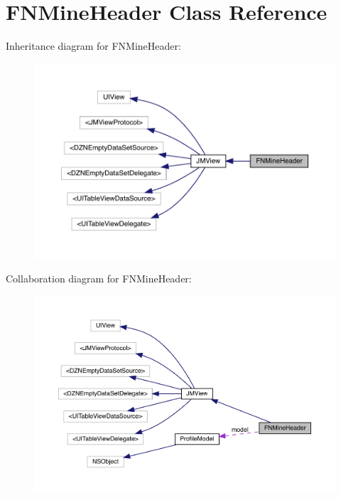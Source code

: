 \hypertarget{interface_f_n_mine_header}{}\section{F\+N\+Mine\+Header Class Reference}
\label{interface_f_n_mine_header}


Inheritance diagram for F\+N\+Mine\+Header\+:\nopagebreak
\begin{figure}[H]
\begin{center}
\leavevmode
\includegraphics[width=350pt]{interface_f_n_mine_header__inherit__graph}
\end{center}
\end{figure}


Collaboration diagram for F\+N\+Mine\+Header\+:\nopagebreak
\begin{figure}[H]
\begin{center}
\leavevmode
\includegraphics[width=350pt]{interface_f_n_mine_header__coll__graph}
\end{center}
\end{figure}
